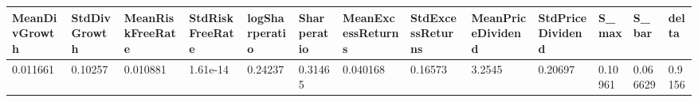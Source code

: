 \begin{tabular}{lllllllllllll}
MeanDivGrowth & StdDivGrowth & MeanRiskFreeRate & StdRiskFreeRate & logSharperatio & Sharperatio & MeanExcessReturns & StdExcessReturns & MeanPriceDividend & StdPriceDividend & S_max & S_bar & delta \\ 
\toprule 
0.011661 & 0.10257 & 0.010881 & 1.61e-14 & 0.24237 & 0.31465 & 0.040168 & 0.16573 & 3.2545 & 0.20697 & 0.10961 & 0.066629 & 0.9156 \\ 
\bottomrule 
\end{tabular}